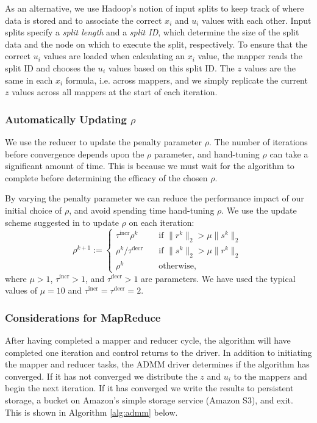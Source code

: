 \documentclass[10pt, conference, compsocconf]{IEEEtran}
\begin{document}
As an alternative, we use Hadoop's notion of input splits to keep track of where data is stored and to associate the correct $x_i$ and $u_i$ values with each other.  Input splits specify a \emph{split length} and a \emph{split ID}, which determine the size of the split data and the node on which to execute the split, respectively.  To ensure that the correct $u_i$ values are loaded when calculating an $x_i$ value, the mapper reads the split ID and chooses the $u_i$ values based on this split ID.  The $z$ values are the same in each $x_i$ formula, i.e. across mappers, and we simply replicate the current $z$ values across all mappers at the start of each iteration.

\subsubsection{Automatically Updating $\rho$}

We use the reducer to update the penalty parameter $\rho$.  The number of iterations before convergence depends upon the $\rho$ parameter, and hand-tuning $\rho$ can take a significant amount of time.  This is because we must wait for the algorithm to complete before determining the efficacy of the chosen $\rho$.

By varying the penalty parameter we can reduce the performance impact of our initial choice of $\rho$, and avoid spending time hand-tuning $\rho$.  We use the update scheme suggested in \cite{boyd} to update $\rho$ on each iteration:
\begin{equation}
\rho^{k+1}:=\begin{cases}
  \tau^{\text{incr}}\rho^k&\quad \text{if $\|r^k\|_2>\mu\|s^k\|_2$}\\
  \rho^k/\tau^{\text{decr}}&\quad \text{if $\|s^k\|_2>\mu\|r^k\|_2$}\\
  \rho^k&\quad \text{otherwise,}
\end{cases}
\label{eq:r}
\end{equation}
where $\mu>1$, $\tau^{\text{incr}}>1$, and $\tau^{\text{decr}}>1$ are parameters.  We have used the typical values of $\mu=10$ and $\tau^{\text{incr}}=\tau^{\text{decr}}=2$.

\subsubsection{Considerations for MapReduce}
After having completed a mapper and reducer cycle,  the algorithm will have completed one iteration and control returns to the driver.  In addition to initiating the mapper and reducer tasks, the ADMM driver determines if the algorithm has converged.  If it has not converged we distribute the $z$ and $u_i$ to the mappers and begin the next iteration.  If it has converged we write the results to persistent storage, a bucket on Amazon's simple storage service (Amazon S3), and exit.  This is shown in Algorithm \ref{alg:admm} below.
\end{document}
